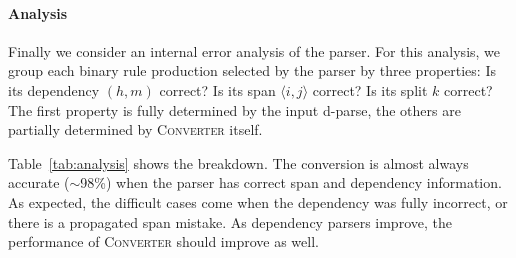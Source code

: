 \documentclass[11pt,letterpaper]{article}
\newcommand{\Span}[1]{\langle #1 \rangle}
\newcommand{\ParseName}{\textsc{Converter}\xspace}
\begin{document}



\paragraph{Analysis}
\label{sec:analysis}
Finally we consider an internal error analysis of
the parser. For this analysis, we group each binary rule production
selected by the parser by three properties:
Is its dependency $(h, m)$ correct? Is its span $\Span{i,j}$ correct? 
Is its split $k$ correct? The first property is fully determined by the 
input d-parse, the others are partially determined by \ParseName itself.

Table~\ref{tab:analysis} shows the breakdown. The
conversion is almost always accurate ($\sim$98\%) when the parser has correct span and
dependency information. As expected, the difficult cases come when the dependency
was fully incorrect, or there is a propagated span mistake. As dependency parsers
improve, the performance of \ParseName{} should improve as well.
 






\end{document}
